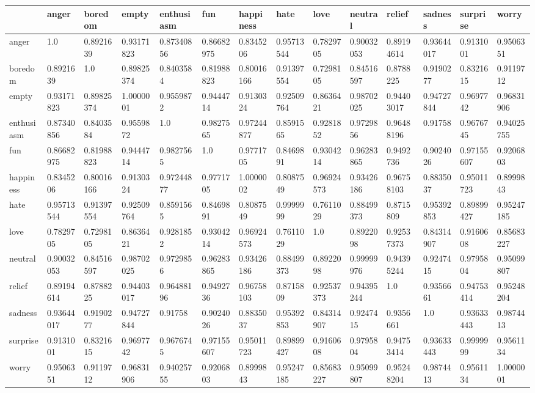 \begin{tabular}{llllllllllllll}
\toprule
 & anger & boredom & empty & enthusiasm & fun & happiness & hate & love & neutral & relief & sadness & surprise & worry \\
\midrule
anger & 1.0 & 0.8921639 & 0.93171823 & 0.87340856 & 0.86682975 & 0.8345206 & 0.95713544 & 0.7829705 & 0.90032053 & 0.89194614 & 0.93644017 & 0.9131001 & 0.9506351 \\
boredom & 0.8921639 & 1.0 & 0.89825374 & 0.8403584 & 0.81988823 & 0.80016166 & 0.91397554 & 0.7298105 & 0.84516597 & 0.8788225 & 0.9190277 & 0.8321615 & 0.9119712 \\
empty & 0.93171823 & 0.89825374 & 1.0000001 & 0.9559872 & 0.9444714 & 0.9130324 & 0.92509764 & 0.8636421 & 0.98702025 & 0.94403017 & 0.94727844 & 0.9697742 & 0.96831906 \\
enthusiasm & 0.87340856 & 0.8403584 & 0.9559872 & 1.0 & 0.9827565 & 0.97244877 & 0.8591565 & 0.9281852 & 0.9729856 & 0.96488196 & 0.91758 & 0.9676745 & 0.94025755 \\
fun & 0.86682975 & 0.81988823 & 0.9444714 & 0.9827565 & 1.0 & 0.9771705 & 0.8469891 & 0.9304214 & 0.96283865 & 0.9492736 & 0.9024026 & 0.97155607 & 0.9206803 \\
happiness & 0.8345206 & 0.80016166 & 0.9130324 & 0.97244877 & 0.9771705 & 1.0000002 & 0.8087549 & 0.96924573 & 0.93426186 & 0.96758103 & 0.8835037 & 0.95011723 & 0.8999843 \\
hate & 0.95713544 & 0.91397554 & 0.92509764 & 0.8591565 & 0.8469891 & 0.8087549 & 0.9999999 & 0.7611029 & 0.88499373 & 0.8715809 & 0.95392853 & 0.89899427 & 0.95247185 \\
love & 0.7829705 & 0.7298105 & 0.8636421 & 0.9281852 & 0.9304214 & 0.96924573 & 0.7611029 & 1.0 & 0.8922098 & 0.92537373 & 0.84314907 & 0.9160608 & 0.85683227 \\
neutral & 0.90032053 & 0.84516597 & 0.98702025 & 0.9729856 & 0.96283865 & 0.93426186 & 0.88499373 & 0.8922098 & 0.99999976 & 0.94395244 & 0.9247415 & 0.9795804 & 0.95099807 \\
relief & 0.89194614 & 0.8788225 & 0.94403017 & 0.96488196 & 0.9492736 & 0.96758103 & 0.8715809 & 0.92537373 & 0.94395244 & 1.0 & 0.9356661 & 0.94753414 & 0.95248204 \\
sadness & 0.93644017 & 0.9190277 & 0.94727844 & 0.91758 & 0.9024026 & 0.8835037 & 0.95392853 & 0.84314907 & 0.9247415 & 0.9356661 & 1.0 & 0.93633443 & 0.9874413 \\
surprise & 0.9131001 & 0.8321615 & 0.9697742 & 0.9676745 & 0.97155607 & 0.95011723 & 0.89899427 & 0.9160608 & 0.9795804 & 0.94753414 & 0.93633443 & 0.9999999 & 0.9561134 \\
worry & 0.9506351 & 0.9119712 & 0.96831906 & 0.94025755 & 0.9206803 & 0.8999843 & 0.95247185 & 0.85683227 & 0.95099807 & 0.95248204 & 0.9874413 & 0.9561134 & 1.0000001 \\
\bottomrule
\end{tabular}
